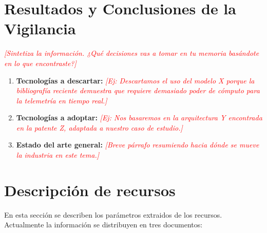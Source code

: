 \documentclass[12pt,a4paper]{article}
\newcommand{\instruccion}[1]{\textcolor{red}{\textit{[#1]}}}
\begin{document}
\section{Resultados y Conclusiones de la Vigilancia}
\instruccion{Sintetiza la información. ¿Qué decisiones vas a tomar en tu memoria basándote en lo que encontraste?}

\begin{enumerate}
    \item \textbf{Tecnologías a descartar:} \instruccion{Ej: Descartamos el uso del modelo X porque la bibliografía reciente demuestra que requiere demasiado poder de cómputo para la telemetría en tiempo real.}
    \item \textbf{Tecnologías a adoptar:} \instruccion{Ej: Nos basaremos en la arquitectura Y encontrada en la patente Z, adaptada a nuestro caso de estudio.}
    \item \textbf{Estado del arte general:} \instruccion{Breve párrafo resumiendo hacia dónde se mueve la industria en este tema.}
\end{enumerate}




\section{Descripción de recursos}

En esta sección se describen los parámetros extraidos de los recursos. Actualmente la información se distribuyen en tres documentos:
\end{document}
